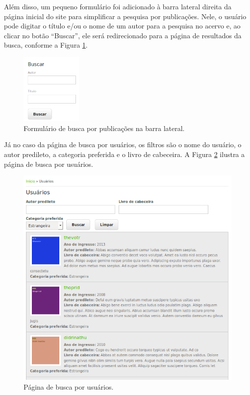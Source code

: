 \documentclass[a4paper]{article}
\begin{document}
Além disso, um pequeno formulário foi adicionado à barra lateral direita da página inicial do site para simplificar a pesquisa por publicações. Nele, o usuário pode digitar o título e/ou o nome de um autor para a pesquisa no acervo e, ao clicar no botão “Buscar”, ele será redirecionado para a página de resultados da busca, conforme a Figura \ref{browse-sidebar}.

\begin{figure}[pbth!]
\centering
\includegraphics[width=30mm]{img/browse-sidebar.png}
\caption{Formulário de busca por publicações na barra lateral.\label{browse-sidebar}}
\end{figure}

Já no caso da página de busca por usuários, os filtros são o nome do usuário, o autor predileto, a categoria preferida e o livro de cabeceira. A Figura \ref{users} ilustra a página de busca por usuários.

\begin{figure}[pbth!]
\centering
\includegraphics[width=120mm]{img/users.png}
\caption{Página de busca por usuários.\label{users}}
\end{figure}
\end{document}
